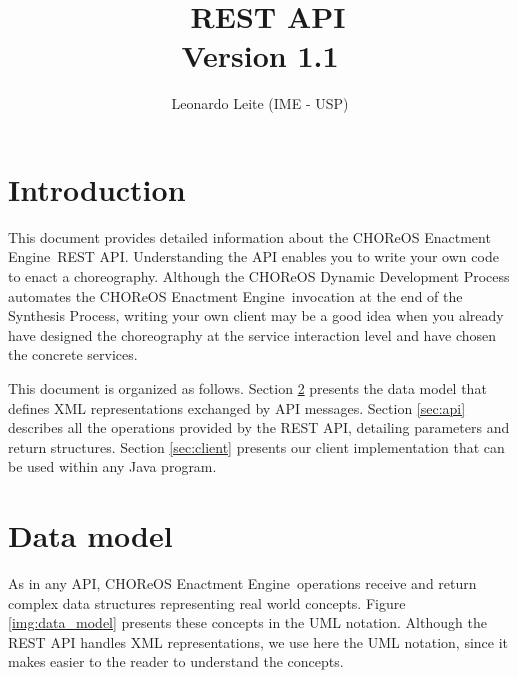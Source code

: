 \documentclass[a4paper, 10pt]{article}
\title{\ee\ REST API \\ {\normalsize Version 1.1}}
\author{Leonardo Leite (IME - USP)}
\newcommand{\ee}{CHOReOS Enactment Engine}
\begin{document}
\maketitle

\section{Introduction}

This document provides detailed information about the \ee\ REST API. 
Understanding the API enables you to write your own code to enact a choreography.
Although the CHOReOS Dynamic Development Process automates the \ee\ invocation at the end of the Synthesis Process, writing your own client may be a good idea when you already have designed the choreography at the service interaction level and have chosen the concrete services. 

This document is organized as follows. Section \ref{sec:model} presents the data model that defines XML representations exchanged by API messages. Section \ref{sec:api} describes all the operations provided by the REST API, detailing parameters and return structures. Section \ref{sec:client} presents our client implementation that can be used within any Java program.

\section{Data model}
\label{sec:model}

As in any API, \ee\ operations receive and return complex data structures representing real world concepts. 
Figure \ref{img:data_model} presents these concepts in the UML notation.
Although the REST API handles XML representations, we use here the UML notation, since it makes easier to the reader to understand the concepts.
\end{document}

